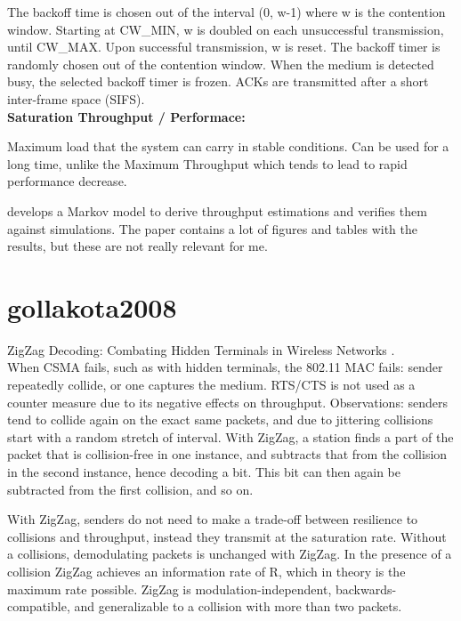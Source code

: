 The backoff time is chosen out of the interval (0, w-1) where w is the contention window. Starting at CW\_MIN, w is doubled on each unsuccessful transmission, until CW\_MAX. Upon successful transmission, w is reset. The backoff timer is randomly chosen out of the contention window. When the medium is detected busy, the selected backoff timer is frozen. ACKs are transmitted after a short inter-frame space (SIFS).\\

\textbf{Saturation Throughput / Performace:}

Maximum load that the system can carry in stable conditions. Can be used for a long time, unlike the Maximum Throughput which tends to lead to rapid performance decrease.

\cite{bianchi2000} develops a Markov model to derive throughput estimations and verifies them against simulations. The paper contains a lot of figures and tables with the results, but these are not really relevant for me.



\section*{gollakota2008}

ZigZag Decoding: Combating Hidden Terminals in Wireless Networks \cite{gollakota2008}.\\

When CSMA fails, such as with hidden terminals, the 802.11 MAC fails: sender repeatedly collide, or one captures the medium. RTS/CTS is not used as a counter measure due to its negative effects on throughput. Observations: senders tend to collide again on the exact same packets, and due to jittering collisions start with a random stretch of interval. With ZigZag, a station finds a part of the packet that is collision-free in one instance, and subtracts that from the collision in the second instance, hence decoding a bit. This bit can then again be subtracted from the first collision, and so on.

With ZigZag, senders do not need to make a trade-off between resilience to collisions and throughput, instead they transmit at the saturation rate. Without a collisions, demodulating packets is unchanged with ZigZag. In the presence of a collision ZigZag achieves an information rate of R, which in theory is the maximum rate possible. ZigZag is modulation-independent, backwards-compatible, and generalizable to a collision with more than two packets.


